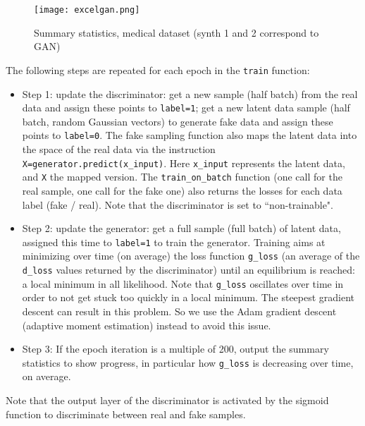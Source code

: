 \documentclass[oneside,10pt]{book}
\begin{document}
\begin{figure}[H]
\centering
\texttt{[image: excelgan.png]}
\caption{Summary statistics, medical dataset (synth 1 and 2 correspond to GAN)}
\label{fig:pictty2xkuu}
\end{figure}

\noindent The following steps are repeated for each epoch in the \texttt{train} function: \vspace{1ex}\nopagebreak

\begin{itemize}\nopagebreak
\item Step 1: update the discriminator: get a new sample (half batch) from the real data and assign these points to \texttt{label=1}; get a new latent data sample (half batch, random Gaussian vectors) to generate fake data and assign these points to \texttt{label=0}. The fake sampling function also maps the latent data  into the space of the real data via the instruction \texttt{X=generator.predict(x\_input)}. Here \texttt{x\_input} represents the latent data, and
 \texttt{X} the mapped version. The \texttt{train\_on\_batch} function (one call for the real sample, one call for the fake one) also returns the losses for each  data label (fake / real). Note that the discriminator is set to ``non-trainable".
\item Step 2: update the generator: get a full sample (full batch) of latent data, assigned this time to \texttt{label=1} to train the generator.
Training aims at minimizing over time (on average) the loss function
 \texttt{g\_loss} (an average of the \texttt{d\_loss} values returned by the discriminator) until an equilibrium is reached: a local minimum in all likelihood.
Note that \texttt{g\_loss} oscillates over time in order to not get stuck too quickly in a local minimum. The steepest gradient descent can result in this problem. So we use the \textcolor{index}{Adam gradient descent} (adaptive moment estimation) instead to avoid this issue.
\item Step 3:  If the epoch iteration is a multiple of 200, output the summary statistics to show progress, in particular how
 \texttt{g\_loss} is decreasing over time, on average.
\end{itemize}\vspace{1ex}

\noindent Note that the output layer of the discriminator is activated by the sigmoid function  to discriminate between real and fake samples.
\end{document}
